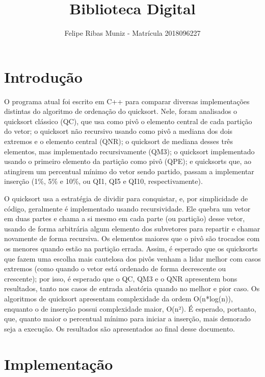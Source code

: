 \documentclass[11pt]{article}
\title{Biblioteca Digital}
\author{Felipe Ribas Muniz - Matrícula 2018096227}
\begin{document}
    
    
    \maketitle
    
    

    
    \section{Introdução}\label{introduuxe7uxe3o}

O programa atual foi escrito em C++ para comparar diversas
implementações distintas do algoritmo de ordenação do quicksort. Nele,
foram analisados o quicksort clássico (QC), que usa como pivô o elemento
central de cada partição do vetor; o quicksort não recursivo usando como
pivô a mediana dos dois extremos e o elemento central (QNR); o quicksort
de mediana desses três elementos, mas implementado recursivamente (QM3);
o quicksort implementado usando o primeiro elemento da partição como
pivô (QPE); e quicksorts que, ao atingirem um percentual mínimo do vetor
sendo partido, passam a implementar inserção (1\%, 5\% e 10\%, ou QI1,
QI5 e QI10, respectivamente).

O quicksort usa a estratégia de dividir para conquistar, e, por
simplicidade de código, geralmente é implementado usando recursividade.
Ele quebra um vetor em duas partes e chama a si mesmo em cada parte (ou
partição) desse vetor, usando de forma arbitrária algum elemento dos
subvetores para repartir e chamar novamente de forma recursiva. Os
elementos maiores que o pivô são trocados com os menores quando estão na
partição errada. Assim, é esperado que os quicksorts que fazem uma
escolha mais cautelosa dos pivôs venham a lidar melhor com casos
extremos (como quando o vetor está ordenado de forma decrescente ou
crescente); por isso, é esperado que o QC, QM3 e o QNR apresentem bons
resultados, tanto nos casos de entrada aleatória quando no melhor e pior
caso. Os algoritmos de quicksort apresentam complexidade da ordem
O(n*log(n)), enquanto o de inserção possui complexidade maior, O(n²). É
esperado, portanto, que, quanto maior o percentual mínimo para iniciar a
inserção, mais demorado seja a execução. Os resultados são apresentados
ao final desse documento.

    \section{Implementação}\label{implementauxe7uxe3o}
\end{document}
